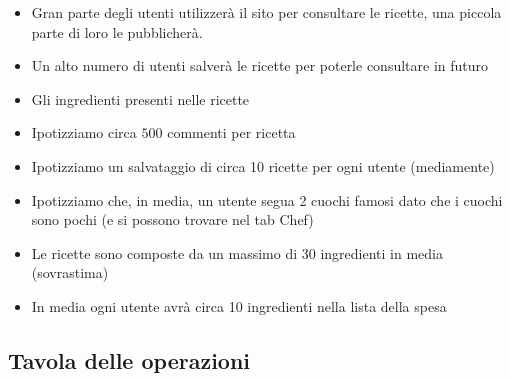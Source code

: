 \documentclass[12pt]{extarticle}
\begin{document}
\begin{itemize}
    \item Gran parte degli utenti utilizzerà il sito per consultare le ricette, una piccola parte di loro le pubblicherà.
    \item Un alto numero di utenti salverà le ricette per poterle consultare in futuro
    \item Gli ingredienti presenti nelle ricette
    \item Ipotizziamo circa $500$ commenti per ricetta
    \item Ipotizziamo un salvataggio di circa 10 ricette per ogni utente (mediamente)
    \item Ipotizziamo che, in media, un utente segua 2 cuochi famosi dato che i cuochi sono pochi (e si possono trovare nel tab Chef)
    \item Le ricette sono composte da un massimo di 30 ingredienti in media (sovrastima)
    \item In media ogni utente avrà circa 10 ingredienti nella lista della spesa
\end{itemize}

\newpage

\subsection{Tavola delle operazioni}
\end{document}
